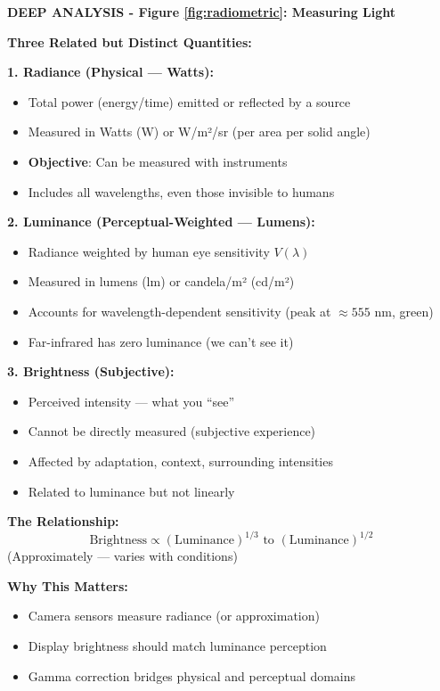 \documentclass[12pt,a4paper]{article}
\begin{document}
\begin{deepexplanation}
\textbf{DEEP ANALYSIS - Figure \ref{fig:radiometric}: Measuring Light}

\textbf{Three Related but Distinct Quantities:}

\textbf{1. Radiance (Physical --- Watts):}
\begin{itemize}
    \item Total power (energy/time) emitted or reflected by a source
    \item Measured in Watts (W) or W/m²/sr (per area per solid angle)
    \item \textbf{Objective}: Can be measured with instruments
    \item Includes all wavelengths, even those invisible to humans
\end{itemize}

\textbf{2. Luminance (Perceptual-Weighted --- Lumens):}
\begin{itemize}
    \item Radiance weighted by human eye sensitivity $V(\lambda)$
    \item Measured in lumens (lm) or candela/m² (cd/m²)
    \item Accounts for wavelength-dependent sensitivity (peak at $\approx 555$ nm, green)
    \item Far-infrared has zero luminance (we can't see it)
\end{itemize}

\textbf{3. Brightness (Subjective):}
\begin{itemize}
    \item Perceived intensity --- what you ``see''
    \item Cannot be directly measured (subjective experience)
    \item Affected by adaptation, context, surrounding intensities
    \item Related to luminance but not linearly
\end{itemize}

\textbf{The Relationship:}
\[
\text{Brightness} \propto (\text{Luminance})^{1/3} \text{ to } (\text{Luminance})^{1/2}
\]
(Approximately --- varies with conditions)

\textbf{Why This Matters:}
\begin{itemize}
    \item Camera sensors measure radiance (or approximation)
    \item Display brightness should match luminance perception
    \item Gamma correction bridges physical and perceptual domains
\end{itemize}
\end{deepexplanation}
\end{document}
